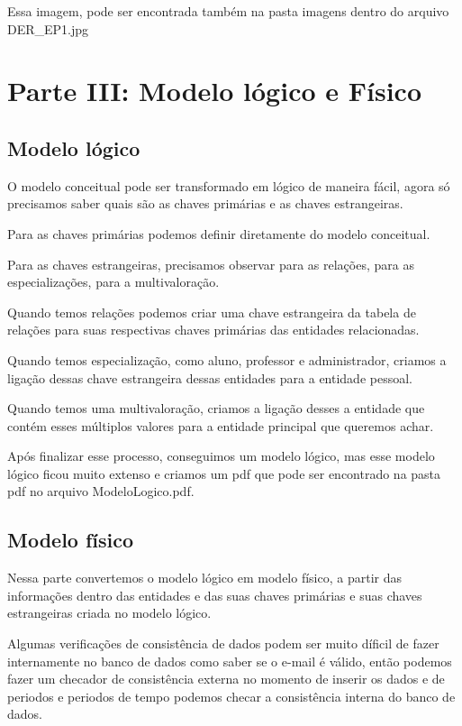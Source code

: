 \documentclass{report}
\begin{document}
Essa imagem, pode ser encontrada também na pasta imagens dentro do arquivo DER\_EP1.jpg


\chapter{Parte III: Modelo lógico e Físico}

\section{Modelo lógico}

O modelo conceitual pode ser transformado em lógico de maneira fácil, agora só precisamos saber quais são as chaves primárias e as chaves estrangeiras.

Para as chaves primárias podemos definir diretamente do modelo conceitual.

Para as chaves estrangeiras, precisamos observar para as relações, para as especializações, para a multivaloração.

Quando temos relações podemos criar uma chave estrangeira da tabela de relações para suas respectivas chaves primárias das entidades relacionadas.

Quando temos especialização, como aluno, professor e administrador, criamos a ligação dessas chave estrangeira dessas entidades para a entidade pessoal.

Quando temos uma multivaloração, criamos a ligação desses a entidade que contém esses múltiplos valores para a entidade principal que queremos achar.

Após finalizar esse processo, conseguimos um modelo lógico, mas esse modelo lógico ficou muito extenso e criamos um pdf que pode ser encontrado na pasta pdf no arquivo ModeloLogico.pdf.



\section{Modelo físico}
Nessa parte convertemos o modelo lógico em modelo físico, a partir das informações dentro das entidades e das suas chaves primárias e suas chaves estrangeiras criada no modelo lógico.

Algumas verificações de consistência de dados podem ser muito díficil de fazer internamente no banco de dados como saber se o e-mail é válido, então podemos fazer um checador de consistência externa no momento de inserir os dados e de periodos e periodos de tempo podemos checar a consistência interna do banco de dados.
\end{document}
